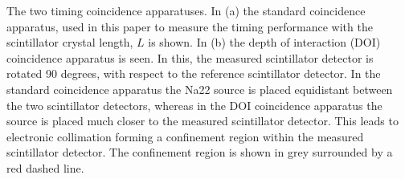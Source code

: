 \label{fig:doi-ctr} The two timing coincidence apparatuses. In (a) the standard coincidence apparatus, used in this paper to measure the timing performance with the scintillator crystal length, $L$ is shown. In (b) the depth of interaction (DOI) coincidence apparatus is seen. In this, the measured scintillator detector is rotated 90 degrees, with respect to the reference scintillator detector. In the standard coincidence apparatus the Na22 source is placed equidistant between the two scintillator detectors, whereas in the DOI coincidence apparatus the source is placed much closer to the measured scintillator detector. This leads to electronic collimation forming a confinement region within the measured scintillator detector. The confinement region is shown in grey surrounded by a red dashed line\cite{Moses_Ullisch_2006}.
